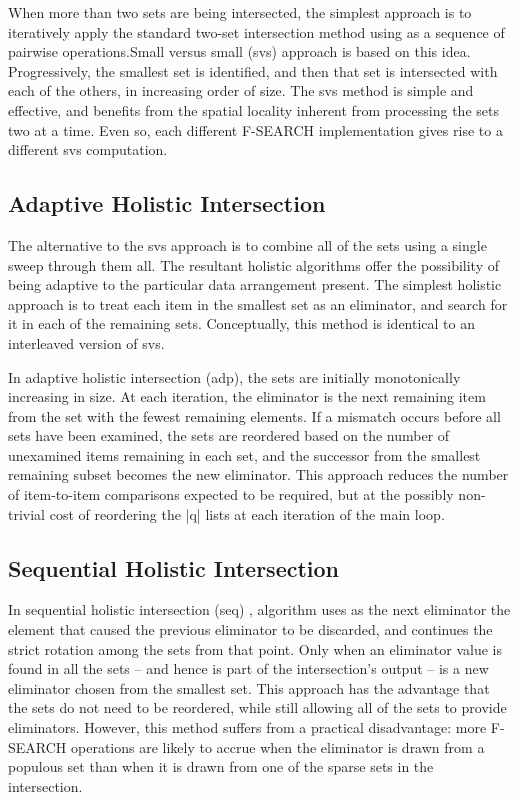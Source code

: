 \documentclass[paper=a4, fontsize=11pt]{scrartcl} %
\numberwithin{equation}{section} %
\numberwithin{figure}{section} %
\numberwithin{table}{section} %
\begin{document}
When more than two sets are being intersected, the simplest approach is to iteratively apply the standard two-set intersection method using as a sequence of pairwise operations.Small versus small (svs) approach is based on this idea. Progressively, the smallest set is identified, and then that set is intersected with each of the others, in increasing order of size. The svs method is simple and effective, and benefits from the spatial locality inherent from processing the sets two at a time. Even so, each different F-SEARCH implementation gives rise to a different svs computation.

\subsection{Adaptive Holistic Intersection}
The alternative to the svs approach is to combine all of the sets using a single sweep through them all. The resultant holistic algorithms offer the possibility of being adaptive to the particular data arrangement present. The simplest holistic approach is to treat each item in the smallest set as an eliminator, and search for it in each of the remaining sets. Conceptually, this method is identical to an interleaved version of svs.

In adaptive holistic intersection (adp), the sets are initially monotonically increasing in size. At each iteration, the eliminator is the next remaining item from the set with the fewest remaining elements. If a mismatch occurs before all sets have been examined, the sets are reordered based on the number of unexamined items remaining in each set, and the successor from the smallest remaining subset becomes the new eliminator. This approach reduces the number of item-to-item comparisons expected to be required, but at the possibly non-trivial cost of reordering the |q| lists at each iteration of the main loop.

\subsection{Sequential Holistic Intersection}

In sequential holistic intersection (seq) , algorithm uses as the next eliminator the element that caused the previous eliminator to be discarded, and continues the strict rotation among the sets from that point. Only when an eliminator value is found in all the sets – and hence is part of the intersection's output – is a new eliminator chosen from the smallest set. This approach has the advantage that the sets do not need to be reordered, while still allowing all of the sets to provide eliminators. However, this method suffers from a practical disadvantage: more F-SEARCH operations are likely to accrue when the eliminator is drawn from a populous set than when it is drawn from one of the sparse sets in the intersection.
\end{document}
